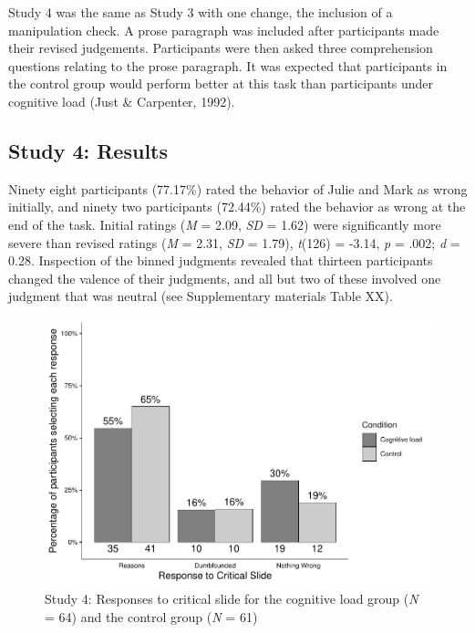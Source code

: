\documentclass[
  american,
  man,floatsintext]{apa7}
\begin{document}
Study 4 was the same as Study 3 with one change, the inclusion of a manipulation check. A prose paragraph was included after participants made their revised judgements. Participants were then asked three comprehension questions relating to the prose paragraph. It was expected that participants in the control group would perform better at this task than participants under cognitive load (Just \& Carpenter, 1992).

\hypertarget{study-4-results}{%
\subsection{Study 4: Results}\label{study-4-results}}

Ninety eight participants (77.17\%) rated the behavior of Julie and Mark as wrong initially, and ninety two participants (72.44\%) rated the behavior as wrong at the end of the task. Initial ratings (\emph{M} = 2.09, \emph{SD} = 1.62) were significantly more severe than revised ratings (\emph{M} = 2.31, \emph{SD} = 1.79), \emph{t}(126) = -3.14, \emph{p} = .002; \emph{d} = 0.28. Inspection of the binned judgments revealed that thirteen participants changed the valence of their judgments, and all but two of these involved one judgment that was neutral (see Supplementary materials Table XX).

\begin{figure}
\centering
\includegraphics{Study_4_files/figure-latex/ch5S4fig2criticalcondition-1.pdf}
\caption{\label{fig:ch5S4fig2criticalcondition}Study 4: Responses to critical slide for the cognitive load group (\emph{N} = 64) and the control group (\emph{N} = 61)}
\end{figure}
\end{document}

